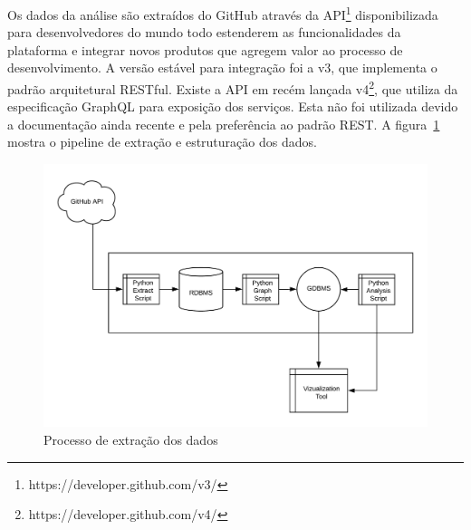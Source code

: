 \documentclass[a4paper,12pt]{monografia}
\theoremstyle{plain}
\theoremstyle{definition}
\theoremstyle{remark}
\begin{document}
Os dados da análise são extraídos do GitHub através da API\footnote{https://developer.github.com/v3/} disponibilizada para desenvolvedores do mundo todo estenderem as funcionalidades da plataforma e integrar novos produtos que agregem valor ao processo de desenvolvimento. A versão estável para integração foi a v3, que implementa o padrão arquitetural RESTful\cite{fielding2002}. Existe a API em recém lançada v4\footnote{https://developer.github.com/v4/}, que utiliza da especificação GraphQL para exposição dos serviços. Esta não foi utilizada devido a documentação ainda recente e pela preferência ao padrão REST. A figura~\ref{fig:processo_extracao} mostra o pipeline de extração e estruturação dos dados.

\begin{figure}[!htbp]
 \includegraphics[width=\textwidth]{processo_extracao}
 \caption{Processo de extração dos dados}\label{fig:processo_extracao}
\end{figure}
\end{document}
